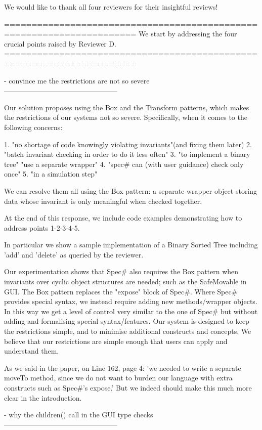We would like to thank all four reviewers for their insightful reviews!

======================================================================
We start by addressing the four crucial points raised by Reviewer D.
======================================================================


- convince me the restrictions are not so severe
------------------------------------------------

Our solution proposes using the Box and the Transform patterns, which makes the restrictions of our systems not so severe. Specifically, when it comes to the following concerns:

1. "no shortage of code knowingly violating invariants"(and fixing them later)
2. "batch invariant checking in order to do it less often"
3. "to implement a binary tree" "use a separate wrapper"
4. "spec# can (with user guidance) check only once"
5. "in a simulation step"

We can resolve them all using the Box pattern: a separate wrapper object storing data whose invariant
is only meaningful when checked together.

At the end of this response, we include code examples demonstrating how to address points 1-2-3-4-5.

In particular we show a sample implementation of a Binary Sorted Tree including 'add' and 'delete' as queried by the reviewer.

Our experimentation shows that Spec# also requires the Box pattern when
invariants over cyclic object structures are needed; such as the SafeMovable in GUI.
The Box pattern replaces the "expose" block of Spec#.
Where Spec# provides special syntax, we instead require adding new methods/wrapper
objects. In this way we get a level of control very similar to the one of Spec#
but without adding and formalising special syntax/features.
Our system is designed to keep the restrictions simple, and to minimise additional constructs and concepts.
We believe that our restrictions are simple enough that users can apply and understand them.

As we said in the paper, on Line 162, page 4: 'we needed to write a separate moveTo method, since we do not want to burden our language with extra constructs such as Spec#’s expose.' But we indeed should make this much more clear in the introduction.


- why the children() call in the GUI type checks
------------------------------------------------

